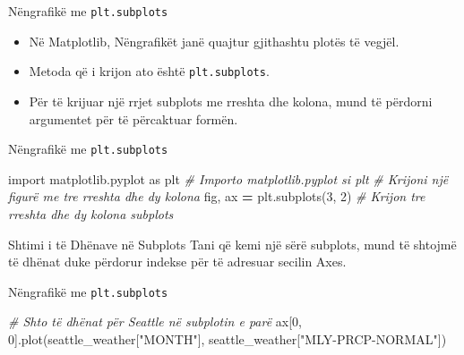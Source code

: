 \documentclass[
  ignorenonframetext,
]{beamer}
\newenvironment{Shaded}{\begin{snugshade}}{\end{snugshade}}
\newcommand{\CommentTok}[1]{\textcolor[rgb]{0.56,0.35,0.01}{\textit{#1}}}
\newcommand{\DecValTok}[1]{\textcolor[rgb]{0.00,0.00,0.81}{#1}}
\newcommand{\ImportTok}[1]{#1}
\newcommand{\NormalTok}[1]{#1}
\newcommand{\OperatorTok}[1]{\textcolor[rgb]{0.81,0.36,0.00}{\textbf{#1}}}
\newcommand{\StringTok}[1]{\textcolor[rgb]{0.31,0.60,0.02}{#1}}
\begin{document}
\begin{frame}[fragile]{Nëngrafikë me \texttt{plt.subplots}}
\protect\hypertarget{nuxebngrafikuxeb-me-plt.subplots}{}
\begin{itemize}
\item
  Në Matplotlib, Nëngrafikët janë quajtur gjithashtu plotës të vegjël.
\item
  Metoda që i krijon ato është \texttt{plt.subplots}.
\item
  Për të krijuar një rrjet subplots me rreshta dhe kolona, mund të
  përdorni argumentet për të përcaktuar formën.
\end{itemize}
\end{frame}

\begin{frame}[fragile]{Nëngrafikë me \texttt{plt.subplots}}
\protect\hypertarget{nuxebngrafikuxeb-me-plt.subplots-1}{}

\begin{Shaded}
\begin{Highlighting}[]
\ImportTok{import}\NormalTok{ matplotlib.pyplot }\ImportTok{as}\NormalTok{ plt  }\CommentTok{\# Importo matplotlib.pyplot si plt}
\CommentTok{\# Krijoni një figurë me tre rreshta dhe dy kolona}
\NormalTok{fig, ax }\OperatorTok{=}\NormalTok{ plt.subplots(}\DecValTok{3}\NormalTok{, }\DecValTok{2}\NormalTok{)  }\CommentTok{\# Krijon tre rreshta dhe dy kolona subplots}
\end{Highlighting}
\end{Shaded}
\end{frame}

\begin{frame}{Shtimi i të Dhënave në Subplots}
\protect\hypertarget{shtimi-i-tuxeb-dhuxebnave-nuxeb-subplots}{}
Tani që kemi një sërë subplots, mund të shtojmë të dhënat duke përdorur
indekse për të adresuar secilin Axes.
\end{frame}

\begin{frame}[fragile]{Nëngrafikë me \texttt{plt.subplots}}
\protect\hypertarget{nuxebngrafikuxeb-me-plt.subplots-2}{}

\begin{Shaded}
\begin{Highlighting}[]
\CommentTok{\# Shto të dhënat për Seattle në subplotin e parë}
\NormalTok{ax[}\DecValTok{0}\NormalTok{, }\DecValTok{0}\NormalTok{].plot(seattle\_weather[}\StringTok{"MONTH"}\NormalTok{], seattle\_weather[}\StringTok{"MLY{-}PRCP{-}NORMAL"}\NormalTok{])  }
\end{Highlighting}
\end{Shaded}
\end{frame}
\end{document}
